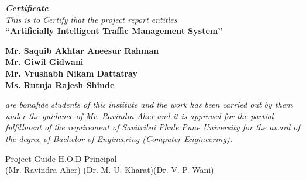 \documentclass[openany,12pt]{report}
\begin{document}
	\fontsize{14}{16}
	\thispagestyle{empty}
	\begin{center}
		\begin{figure}[h]
			\centerline{}
			\label{atcres}
		\end{figure}
		\vspace{0.1in}
		{\it \Huge  \textbf{Certificate}}
		\vspace{0.2in}\\
		{\it This is to Certify that the project report entitles}\\
		\vspace{0.2in}
		{\Large \bf ``Artificially Intelligent Traffic Management System''}\\
		\vspace{0.2in}
		
		{\bf Mr. Saquib Akhtar Aneesur Rahman}\\
		{\bf Mr. Giwil Gidwani  }\\
		{\bf Mr. Vrushabh Nikam Dattatray     }\\
		{\bf Ms. Rutuja Rajesh Shinde    }\\
	\end{center}
	\vspace{0.3in}
	{\it are bonafide students of this institute and the work has been carried out by them under
		the guidance of Mr. Ravindra Aher and it is approved for the partial fulfillment of the
		requirement of Savitribai Phule Pune University for the award of the degree of Bachelor
		of Engineering (Computer Engineering).}\\
	\vspace{0.2in}
	\vspace{0.7in}
	\noindent
	
	\hspace{0.1in} Project Guide  \hspace{1.5in}H.O.D \hspace{0.9in} Principal  \\
	\hspace{4.6in} (Mr. Ravindra Aher) \hspace{0.6in}(Dr. M. U. Kharat)\hspace{0.4in}(Dr. V. P. Wani)\\
	\vspace{0.2in}
	
\end{document}
